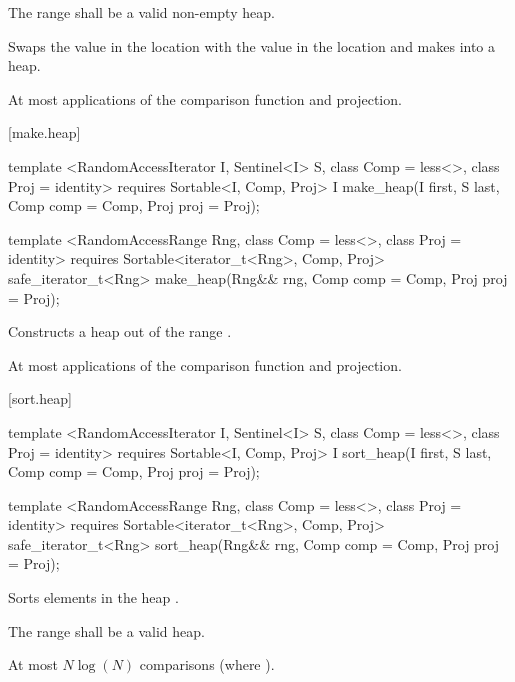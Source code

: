 \begin{itemdescr}
\pnum
\requires
The range
shall be a valid non-empty heap.

\pnum
\effects
Swaps the value in the location 
with the value in the location
and makes
into a heap.

\pnum
\returns {}

\pnum
\complexity
At most
applications of the comparison function and projection.
\end{itemdescr}

[make.heap]{}

%
\begin{itemdecl}
template <RandomAccessIterator I, Sentinel<I> S, class Comp = less<>,
    class Proj = identity>
  requires Sortable<I, Comp, Proj>
  I make_heap(I first, S last, Comp comp = Comp{}, Proj proj = Proj{});

template <RandomAccessRange Rng, class Comp = less<>, class Proj = identity>
  requires Sortable<iterator_t<Rng>, Comp, Proj>
  safe_iterator_t<Rng>
    make_heap(Rng&& rng, Comp comp = Comp{}, Proj proj = Proj{});
\end{itemdecl}

\begin{itemdescr}
\pnum
\effects
Constructs a heap out of the range
.

\pnum
\returns {}

\pnum
\complexity
At most
applications of the comparison function and projection.
\end{itemdescr}

[sort.heap]{}

%
\begin{itemdecl}
template <RandomAccessIterator I, Sentinel<I> S, class Comp = less<>,
    class Proj = identity>
  requires Sortable<I, Comp, Proj>
  I sort_heap(I first, S last, Comp comp = Comp{}, Proj proj = Proj{});

template <RandomAccessRange Rng, class Comp = less<>, class Proj = identity>
  requires Sortable<iterator_t<Rng>, Comp, Proj>
  safe_iterator_t<Rng>
    sort_heap(Rng&& rng, Comp comp = Comp{}, Proj proj = Proj{});
\end{itemdecl}

\begin{itemdescr}
\pnum
\effects
Sorts elements in the heap
.

\pnum
\requires The range  shall be a valid heap.

\pnum
\returns {}

\pnum
\complexity
At most $N \log(N)$
comparisons (where
).
\end{itemdescr}

